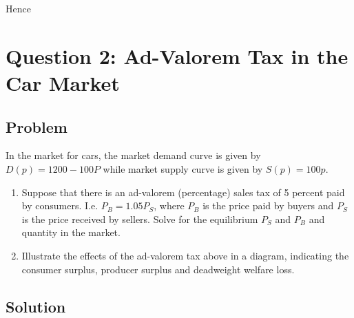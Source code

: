 \documentclass[12pt]{article}
\begin{document}
\begin{enumerate}[label=(\alph*)]
    Hence
    \begin{center}
    \end{center}
\end{enumerate}


\newpage

\newpage
\section{Question 2: Ad-Valorem Tax in the Car Market}

\subsection{Problem}
\noindent
In the market for cars, the market demand curve is given by \(D(p) = 1200 - 100P\) while market supply curve is given by \(S(p) = 100p\).
\begin{enumerate}[label=(\alph*), leftmargin=*]
  \item Suppose that there is an ad-valorem (percentage) sales tax of 5 percent paid by consumers. I.e. \(P_B = 1.05P_S\), where \(P_B\) is the price paid by buyers and \(P_S\) is the price received by sellers. Solve for the equilibrium \(P_S\) and \(P_B\) and quantity in the market.
  \item Illustrate the effects of the ad-valorem tax above in a diagram, indicating the consumer surplus, producer surplus and deadweight welfare loss.
\end{enumerate}
\subsection{Solution}
\end{document}
